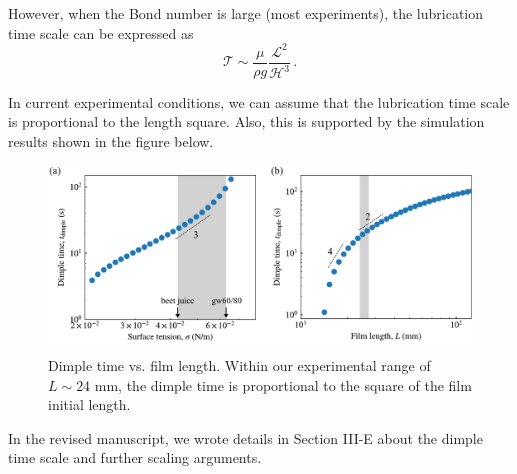 \documentclass[11pt]{article}
\newif\ifhighlight
\newcommand{\hl}[1]{\ifhighlight\textcolor{blue}{#1}\else#1\fi}
\begin{document}
However, when the Bond number is large (most experiments), the lubrication time scale can be expressed as 
\begin{equation}
    \mathcal{T} \sim \frac{\mu}{\rho g} \frac{\mathcal{L}^2}{\mathcal{H}^3} \,.
\end{equation}

In current experimental conditions, we can assume that the lubrication time scale is proportional to the length square. Also, this is supported by the simulation results shown in the figure below.

\begin{figure}[ht]
    \centering
    \includegraphics[width=0.9\linewidth]{Figures/surface_tension_and_film_length.pdf}
    \caption{Dimple time vs. film length. Within our experimental range of $L \sim 24$ mm, the dimple time is proportional to the square of the film initial length.}
    \label{fig:tention_length}
\end{figure}


\hl{
In the revised manuscript, we wrote details in Section III-E about the dimple time scale and further scaling arguments. 
}




\end{document}
